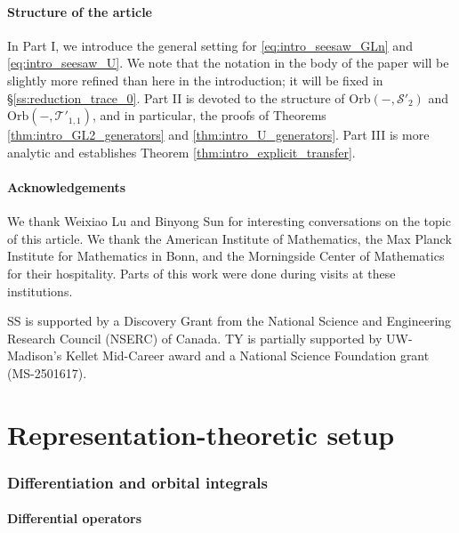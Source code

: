 \documentclass[reqno, 11pt]{amsart} %
\numberwithin{equation}{section}
\theoremstyle{plain}
\theoremstyle{definition}
\theoremstyle{remark}
\newcommand{\mcS}{\mathcal{S}}
\newcommand{\mcT}{\mathcal{T}}
\newcommand{\Orb}{\mathrm{Orb}}
\begin{document}
\subsection{Structure of the article}

In Part I, we introduce the general setting for \eqref{eq:intro_seesaw_GLn} and \eqref{eq:intro_seesaw_U}. We note that the notation in the body of the paper will be slightly more refined than here in the introduction; it will be fixed in \S\ref{ss:reduction_trace_0}. Part II is devoted to the structure of $\Orb(-,\mcS'_2)$ and $\Orb(-,\mcT'_{1,1})$, and in particular, the proofs of Theorems \ref{thm:intro_GL2_generators} and \ref{thm:intro_U_generators}. Part III is more analytic and establishes Theorem \ref{thm:intro_explicit_transfer}.

\subsection{Acknowledgements}

        We thank Weixiao Lu and Binyong Sun for interesting conversations on the topic of this article. We thank the American Institute of Mathematics, the Max Planck Institute for Mathematics in Bonn, and the Morningside Center of Mathematics for their hospitality. Parts of this work were done during visits at these institutions.

SS is supported by a Discovery Grant from the National Science and Engineering Research Council (NSERC) of Canada. TY is partially supported by UW-Madison's Kellet Mid-Career award and a National Science Foundation grant (MS-2501617).


\part{Representation-theoretic setup}
\section{Differentiation and orbital integrals}

\subsection{Differential operators}
\end{document}
